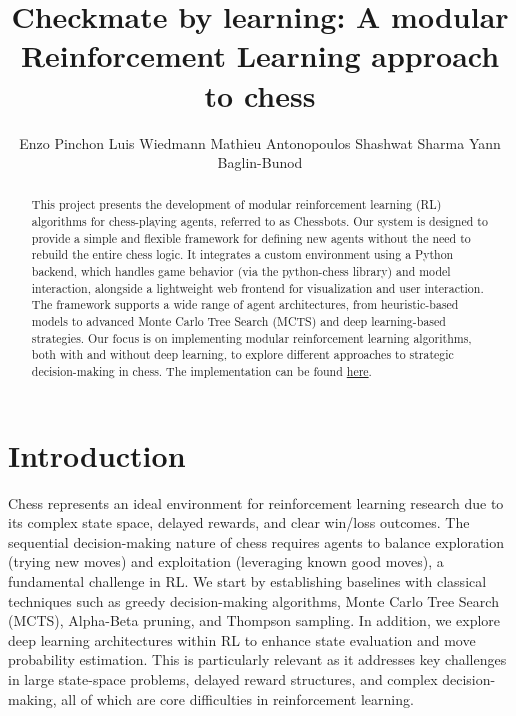 \documentclass[journal, a4paper]{IEEEtran}
\begin{document}
\title{Checkmate by learning: A modular Reinforcement Learning approach to chess}
\author{Enzo Pinchon \hspace{3pt} Luis Wiedmann \hspace{3pt} Mathieu Antonopoulos \hspace{3pt} Shashwat Sharma  \hspace{3pt} Yann Baglin-Bunod }
\maketitle

\begin{abstract}
    This project presents the development of modular reinforcement learning (RL) algorithms for chess-playing agents, referred to as Chessbots. Our system is designed to provide a simple and flexible framework for defining new agents without the need to rebuild the entire chess logic. It integrates a custom environment using a Python backend, which handles game behavior (via the python-chess library) and model interaction, alongside a lightweight web frontend for visualization and user interaction. The framework supports a wide range of agent architectures, from heuristic-based models to advanced Monte Carlo Tree Search (MCTS) and deep learning-based strategies. Our focus is on implementing modular reinforcement learning algorithms, both with and without deep learning, to explore different approaches to strategic decision-making in chess. The implementation can be found \href{https://github.com/Enzo-py/chess-bot}{here}.
\end{abstract}

\section{Introduction}
\label{sec:intro}

Chess represents an ideal environment for reinforcement learning research due to its complex state space, delayed rewards, and clear win/loss outcomes. The sequential decision-making nature of chess requires agents to balance exploration (trying new moves) and exploitation (leveraging known good moves), a fundamental challenge in RL. We start by establishing baselines with classical techniques such as greedy decision-making algorithms, Monte Carlo Tree Search (MCTS), Alpha-Beta pruning, and Thompson sampling. In addition, we explore deep learning architectures within RL to enhance state evaluation and move probability estimation. 
This is particularly relevant as it addresses key challenges in large state-space problems, delayed reward structures, and complex decision-making, all of which are core difficulties in reinforcement learning.
    
\end{document}

